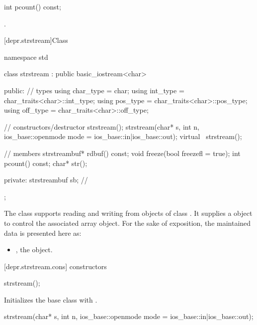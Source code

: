 %
\begin{itemdecl}
int pcount() const;
\end{itemdecl}

\begin{itemdescr}
\pnum
\returns
{}.
\end{itemdescr}

[depr.strstream]{Class }

%
\begin{codeblock}
namespace std {
  class strstream
    : public basic_iostream<char> {
  public:
    // types
    using char_type = char;
    using int_type  = char_traits<char>::int_type;
    using pos_type  = char_traits<char>::pos_type;
    using off_type  = char_traits<char>::off_type;

    // constructors/destructor
    strstream();
    strstream(char* s, int n,
              ios_base::openmode mode = ios_base::in|ios_base::out);
    virtual ~strstream();

    // members
    strstreambuf* rdbuf() const;
    void freeze(bool freezefl = true);
    int pcount() const;
    char* str();

  private:
    strstreambuf sb;            // \expos
  };
}
\end{codeblock}

\pnum
The class
supports reading and writing from objects of class
.
It supplies a
object to control the associated array object.
For the sake of exposition, the maintained data is presented here as:

\begin{itemize}
\item
{}, the  object.
\end{itemize}

[depr.strstream.cons]{ constructors}

%
\begin{itemdecl}
strstream();
\end{itemdecl}

\begin{itemdescr}
\pnum
\effects
Initializes the base class with .
\end{itemdescr}

%
\begin{itemdecl}
strstream(char* s, int n,
          ios_base::openmode mode = ios_base::in|ios_base::out);
\end{itemdecl}

